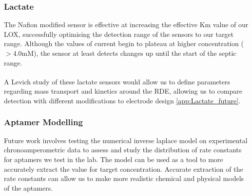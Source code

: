 \subsubsection{Lactate}
The Nafion modified sensor is effective at increasing the effective Km value of our LOX, successfully optimising the detection range of the sensors to our target range. Although the values of current begin to plateau at higher concentration ($>$4.0mM), the sensor at least detects changes up until the start of the septic range.\\\\
A Levich study of these lactate sensors would allow us to define parameters regarding mass transport and kinetics around the RDE, allowing us to compare detection with different modifications to electrode design \autoref{app:Lactate_future}.
\subsubsection{Aptamer Modelling}
Future work involves testing the numerical inverse laplace model on experimental chronoamperometric data to assess and study the distribution of rate constants for aptamers we test in the lab. The model can be used as a tool to more accurately extract the value for target concentration. Accurate extraction of the rate constants can allow us to make more realistic chemical and physical models of the aptamers.
\newpage
